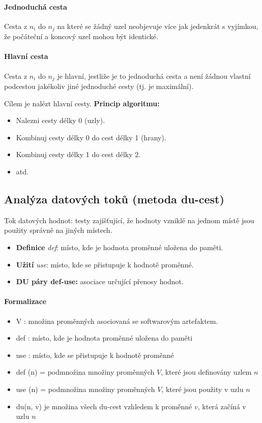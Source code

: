 \paragraph{Jednoduchá cesta} Cesta z $n_i$ do $n_j$ na které se žádný uzel neobjevuje více jak jedenkrát s vyjímkou, že počáteční a koncový uzel mohou být identické.

\paragraph{Hlavní cesta} Cesta z $n_i$ do $n_j$ je hlavní, jestliže je to jednoduchá cesta a není žádnou vlastní podcestou jakékoliv jiné jednoduché cesty (tj. je maximální).

\noindent Cílem je nalézt hlavní cesty. \textbf{Princip algoritmu:}

\begin{itemize}[itemsep=0px]
\item Nalezni cesty délky 0 (uzly).
\item Kombinuj cesty délky 0 do cest délky 1 (hrany).
\item Kombinuj cesty délky 1 do cest délky 2.
\item atd.
\end{itemize}

\subsection{Analýza datových toků (metoda du-cest)}
Tok datových hodnot: testy zajišťující, že hodnoty vzniklé na jednom místě jsou použity správně na jiných místech. 

\begin{itemize}[itemsep=0px]
\item \textbf{Definice} \textit{def}: místo, kde je hodnota proměnné uložena do paměti. 
\item \textbf{Užití} \textit{use}: místo, kde se přistupuje k hodnotě proměnné.
\item \textbf{DU páry def-use:} asociace určující přenosy hodnot. 
\end{itemize}

\paragraph{Formalizace}
\begin{itemize}[itemsep=0px]
\item V : množina proměnných asociovaná se softwarovým artefaktem. 
\item def : místo, kde je hodnota proměnné uložena do paměti
\item use : místo, kde se přistupuje k hodnotě proměnné
\item def (n) = podmnožina množiny proměnných $V$, které jsou definovány uzlem $n$
\item use (n) = podmnožina množiny proměnných $V$, které jsou použity v uzlu $n$
\item du(n, v) je množina všech du-cest vzhledem k proměnné $v$, která začíná v uzlu $n$
\end{itemize}

